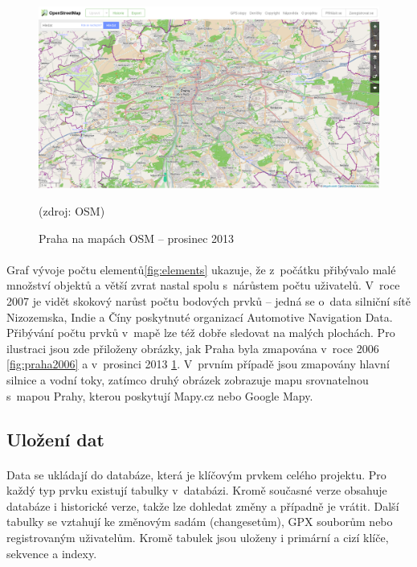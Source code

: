 \documentclass[11pt,a4paper,titlepage,oneside]{book}
\begin{document}

		\begin{figure}[!h]
			\begin{center}
				\includegraphics[width=12cm]{obrazky/Osm-201312-praha.png}
				\caption{Praha na mapách \ac{OSM} -- prosinec 2013}(zdroj: \ac{OSM}\cite{osm_wikipedia_cs})
				\label{fig:praha2013}
			\end{center}
		\end{figure}




		\paragraph{} Graf vývoje počtu elementů\ref{fig:elements} ukazuje, že z~počátku přibývalo malé množství objektů a větší zvrat nastal spolu s~nárůstem počtu uživatelů. V~roce 2007 je vidět skokový narůst počtu bodových prvků -- jedná se o~data silniční sítě Nizozemska, Indie a Číny poskytnuté organizací Automotive Navigation Data. 
		Přibývání počtu prvků v~mapě lze též dobře sledovat na malých plochách. Pro ilustraci jsou zde přiloženy obrázky, jak Praha byla zmapována v~roce 2006 \ref{fig:praha2006} a v~prosinci 2013 \ref{fig:praha2013}. V~prvním případě jsou zmapovány hlavní silnice a vodní toky, zatímco druhý obrázek zobrazuje mapu srovnatelnou s~mapou Prahy, kterou poskytují Mapy.cz nebo Google Mapy.
	
	\subsection{Uložení dat}
		\paragraph{} Data se ukládají do databáze, která je klíčovým prvkem celého projektu. Pro každý typ prvku existují tabulky v~databázi. Kromě současné verze obsahuje databáze i historické verze, takže lze dohledat změny a případně je vrátit. Další tabulky se vztahují ke změnovým sadám (changesetům), GPX souborům nebo registrovaným uživatelům. Kromě tabulek jsou uloženy i primární a cizí klíče, sekvence a indexy.
\end{document}
